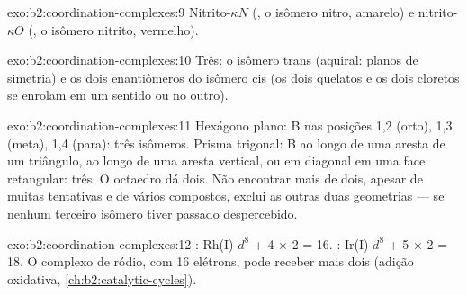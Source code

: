 \begin{solution}{exo:b2:coordination-complexes:9}
Nitrito-$\kappa N$ (, o isômero nitro, amarelo) e nitrito-$\kappa O$
(, o isômero nitrito, vermelho).
\end{solution}

\begin{solution}{exo:b2:coordination-complexes:10}
Três: o isômero trans (aquiral: planos de simetria) e os dois enantiômeros do
isômero cis (os dois quelatos e os dois cloretos se enrolam em um sentido ou
no outro).
\end{solution}

\begin{solution}{exo:b2:coordination-complexes:11}
Hexágono plano: B nas posições 1,2 (orto), 1,3 (meta), 1,4 (para): três
isômeros. Prisma trigonal: B ao longo de uma aresta de um triângulo, ao longo
de uma aresta vertical, ou em diagonal em uma face retangular: três. O
octaedro dá dois. Não encontrar mais de dois, apesar de muitas tentativas e
de vários compostos, exclui as outras duas geometrias --- se nenhum terceiro
isômero tiver passado despercebido.
\end{solution}

\begin{solution}{exo:b2:coordination-complexes:12}
: Rh(I) $d^8$ + 4 × 2 = 16. : Ir(I) $d^8$ + 5 × 2 =
18. O complexo de ródio, com 16 elétrons, pode receber mais dois (adição
oxidativa, \cref{ch:b2:catalytic-cycles}).
\end{solution}

